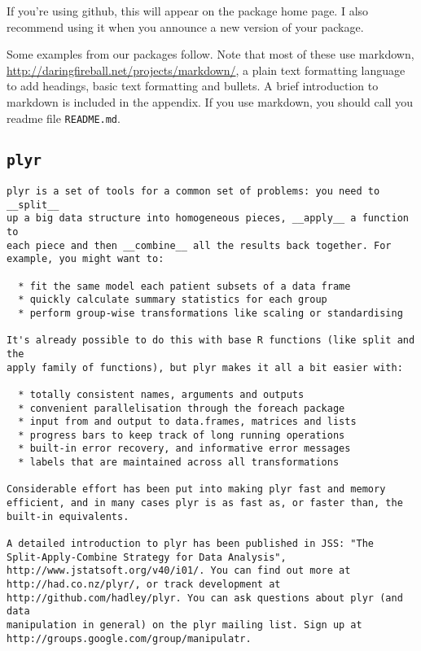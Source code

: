 If you're using github, this will appear on the package home page. I
also recommend using it when you announce a new version of your package.

Some examples from our packages follow. Note that most of these use
markdown, \url{http://daringfireball.net/projects/markdown/}, a plain
text formatting language to add headings, basic text formatting and
bullets. A brief introduction to markdown is included in the appendix.
If you use markdown, you should call you readme file \texttt{README.md}.

\subsection{\texttt{plyr}}

\begin{verbatim}
plyr is a set of tools for a common set of problems: you need to __split__
up a big data structure into homogeneous pieces, __apply__ a function to
each piece and then __combine__ all the results back together. For
example, you might want to:

  * fit the same model each patient subsets of a data frame
  * quickly calculate summary statistics for each group
  * perform group-wise transformations like scaling or standardising

It's already possible to do this with base R functions (like split and the
apply family of functions), but plyr makes it all a bit easier with:

  * totally consistent names, arguments and outputs
  * convenient parallelisation through the foreach package
  * input from and output to data.frames, matrices and lists
  * progress bars to keep track of long running operations
  * built-in error recovery, and informative error messages
  * labels that are maintained across all transformations

Considerable effort has been put into making plyr fast and memory
efficient, and in many cases plyr is as fast as, or faster than, the
built-in equivalents.

A detailed introduction to plyr has been published in JSS: "The
Split-Apply-Combine Strategy for Data Analysis",
http://www.jstatsoft.org/v40/i01/. You can find out more at
http://had.co.nz/plyr/, or track development at
http://github.com/hadley/plyr. You can ask questions about plyr (and data
manipulation in general) on the plyr mailing list. Sign up at
http://groups.google.com/group/manipulatr.
\end{verbatim}

